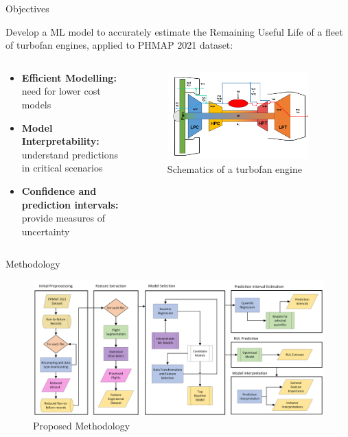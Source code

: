 \documentclass{beamer}
\begin{document}
    \begin{frame}{Objectives}

        Develop a ML model to accurately estimate the Remaining Useful Life of a fleet of turbofan engines, applied to PHMAP 2021 dataset:
        \begin{columns}
            \begin{column}{0.5\textwidth}
                \begin{itemize}
                    \item \textbf{Efficient Modelling:} need for lower cost models
                    \item \textbf{Model Interpretability:} understand predictions in critical scenarios
                    \item \textbf{Confidence and prediction intervals:} provide measures of uncertainty
                \end{itemize}
            \end{column}
            \begin{column}{0.5\textwidth}
                \begin{figure}
                    \centering
                    \includegraphics[width=0.9\textwidth]{cmapss_turbofan.png}
                    \caption{Schematics of a turbofan engine}
                \end{figure}
            \end{column}
        \end{columns}
    \end{frame}

    \begin{frame}{Methodology}
        \begin{figure}[!htbp]
            \centering
            \includegraphics[scale=0.2]{research_diagram.png}
            \caption{Proposed Methodology}
        \end{figure}
    \end{frame}
\end{document}
